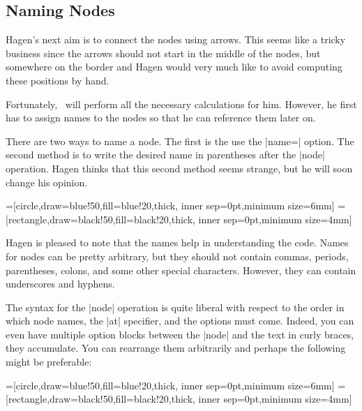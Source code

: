 \subsection{Naming Nodes}

Hagen's next aim is to connect the nodes using arrows. This seems like
a tricky business since the arrows should not start in the middle of
the nodes, but somewhere on the border and Hagen would very much like
to avoid computing these positions by hand.

Fortunately, \pgfname\ will perform all the necessary calculations for
him. However, he first has to assign names to the nodes so that he can
reference them later on.

There are two ways to name a node. The first is the use the |name=|
option. The second method is to write the desired name in parentheses
after the |node| operation. Hagen thinks that this second method seems
strange, but he will soon change his opinion.

{
=[circle,draw=blue!50,fill=blue!20,thick,
                   inner sep=0pt,minimum size=6mm]
=[rectangle,draw=black!50,fill=black!20,thick,
                        inner sep=0pt,minimum size=4mm]
\begin{codeexample}[]
\end{codeexample}
}

Hagen is pleased to note that the names help in understanding the
code. Names for nodes can be pretty arbitrary, but they should not
contain commas, periods, parentheses, colons, and some other special
characters. However, they can contain underscores and hyphens. 

The syntax for the |node| operation is quite liberal with respect to
the order in which node names, the |at| specifier, and the options
must come. Indeed, you can even have multiple option blocks between
the |node| and the text in curly braces, they accumulate. You can
rearrange them arbitrarily and perhaps the following might be preferable:

{
=[circle,draw=blue!50,fill=blue!20,thick,
                   inner sep=0pt,minimum size=6mm]
=[rectangle,draw=black!50,fill=black!20,thick,
                        inner sep=0pt,minimum size=4mm]
\begin{codeexample}[]
\end{codeexample}
}



